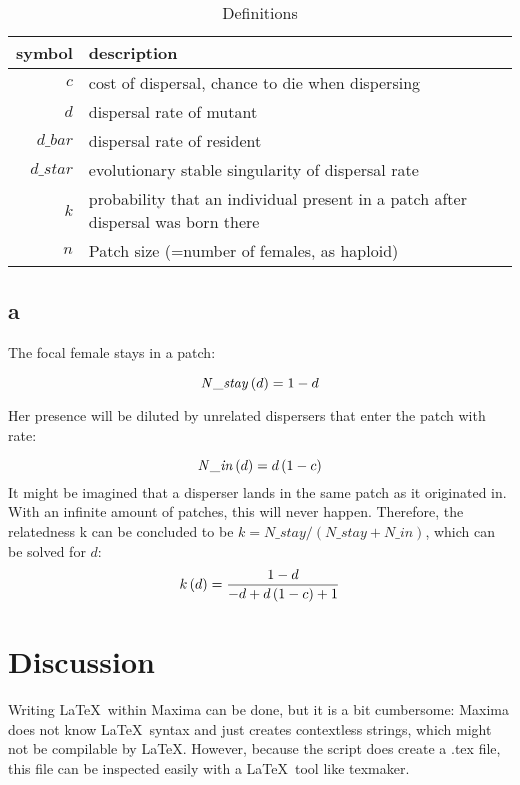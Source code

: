 \documentclass{article}
\begin{document}
\begin{table}[here]
  \centering
  \begin{tabular}{ | r | l | }
    \hline
    symbol & description \\
    \hline
    $c$      & cost of dispersal, chance to die when dispersing \\
    $d$      & dispersal rate of mutant \\
    $d\_bar$  & dispersal rate of resident \\
    $d\_star$ & evolutionary stable singularity of dispersal rate \\
    $k$      & probability that an individual present in a patch after dispersal was born there \\
    $n$      & Patch size (=number of females, as haploid) \\
    \hline
  \end{tabular}
  \caption{Definitions}
  \label{table:table_definition}
\end{table}

\subsection{a}

The focal female stays in a patch:

\begin{equation}
{\it N\_stay}\left(d\right)=1-d\label{eq:a_1}
\end{equation}

Her presence will be diluted by unrelated dispersers that enter the patch with rate:

\begin{equation}
{\it N\_in}\left(d\right)=d\left(1-c\right)\label{eq:a_2}
\end{equation}
It might be imagined that a disperser lands in the same patch as it originated in. With an infinite amount of patches, this will never happen.
Therefore, the relatedness k can be concluded to be $k = N\_stay / (N\_stay + N\_in)$, which can be solved for $d$:
\begin{equation}
k\left(d\right)={{1-d}\over{-d+d\left(1-c\right)+1}}\label{eq:a_3}
\end{equation}
\section{Discussion}

Writing \LaTeX~within Maxima can be done, but it is a bit cumbersome:
Maxima does not know \LaTeX~syntax and just creates contextless strings,
which might not be compilable by \LaTeX.
However, because the script does create a .tex file,
this file can be inspected easily with a \LaTeX~tool like texmaker.
\end{document}
